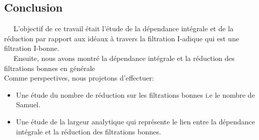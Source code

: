 \begin{center}
	\chapter*{Conclusion}
\end{center}

$ \quad $ L'objectif de ce travail était l'étude de la dépendance intégrale et de la réduction par rapport aux idéaux à travers la filtration I-adique qui est une filtration I-bonne. \\
$ \quad $ Ensuite, nous avons montré la dépendance intégrale et la réduction des filtrations bonnes en générale\\

Comme perspectives, nous projetons d'effectuer:\\
\begin{itemize}
	\item Une étude du nombre de réduction sur les filtrations bonnes i.e le nombre de Samuel.
	\item Une étude de la largeur analytique qui représente le lien entre la dépendance intégrale et la réduction des filtrations bonnes.\\
\end{itemize}



